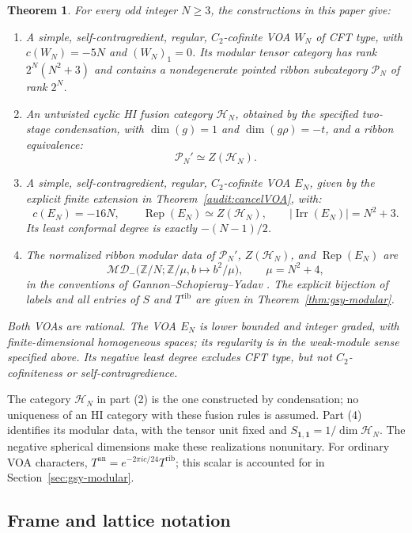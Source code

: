 \documentclass[11pt,a4paper]{article}
\numberwithin{equation}{section}
\newtheorem{theorem}{Theorem}[section]
\theoremstyle{definition}\newtheorem{definition}[theorem]{Definition}
\theoremstyle{remark}\newtheorem{remark}[theorem]{Remark}
\newcommand{\one}{\mathbf1}\newcommand{\B}{\mathcal B}\newcommand{\W}{W_N}
\newcommand{\Rep}{\operatorname{Rep}}\newcommand{\Ext}{\operatorname{Ext}}
\begin{document}
\begin{theorem}\label{thm:main}\label{r:thm:main}
For every odd integer $N\geq3$, the constructions in this paper give:
\begin{enumerate}
\item A simple, self-contragredient, regular, $C_2$-cofinite VOA $W_N$
of CFT type, with $c(W_N)=-5N$ and $(W_N)_1=0$.
Its modular tensor category has rank $2^N(N^2+3)$ and contains a
nondegenerate pointed ribbon subcategory $\mathcal P_N$ of rank $2^N$.
\item An untwisted cyclic HI fusion category $\mathcal H_N$,
obtained by the specified two-stage condensation, with
$\dim(g)=1$ and $\dim(g\rho)=-t$, and a ribbon equivalence:
\[
 \mathcal P_N'\simeq Z(\mathcal H_N).
\]
\item A simple, self-contragredient, regular, $C_2$-cofinite VOA $E_N$,
given by the explicit finite extension in
Theorem~\ref{audit:cancelVOA}, with:
\[
 c(E_N)=-16N,\qquad
 \operatorname{Rep}(E_N)\simeq Z(\mathcal H_N),\qquad
 |\operatorname{Irr}(E_N)|=N^2+3.
\]
Its least conformal degree is exactly $-(N-1)/2$.
\item The normalized ribbon modular data of
$\mathcal P_N'$, $Z(\mathcal H_N)$, and $\Rep(E_N)$ are
\[
 \mathcal{MD}_{-}\bigl(\mathbb Z/N;\mathbb Z/\mu,
                            b\longmapsto b^2/\mu\bigr),
 \qquad \mu=N^2+4,
\]
in the conventions of Gannon--Schopieray--Yadav
\cite[Appendix F.1]{gsy}. The explicit bijection of labels and all
entries of $S$ and $T^{\mathrm{rib}}$ are given in
Theorem~\ref{thm:gsy-modular}.
\end{enumerate}
Both VOAs are rational. The VOA $E_N$ is lower bounded and integer
graded, with finite-dimensional homogeneous spaces; its regularity
is in the weak-module sense specified above. Its negative least
degree excludes CFT type, but not $C_2$-cofiniteness or
self-contragredience.
\end{theorem}

The category $\mathcal H_N$ in part (2) is the one constructed by
condensation; no uniqueness of an HI category with these fusion rules
is assumed. Part (4) identifies its modular data, with the tensor unit
fixed and $S_{\one,\one}=1/\dim\mathcal H_N$. The negative spherical
dimensions make these realizations nonunitary.
For ordinary VOA characters, $T^{\mathrm{an}}=e^{-2\pi i c/24}T^{\mathrm{rib}}$;
this scalar is accounted for in Section~\ref{sec:gsy-modular}.

\subsection{Frame and lattice notation}
\end{document}
